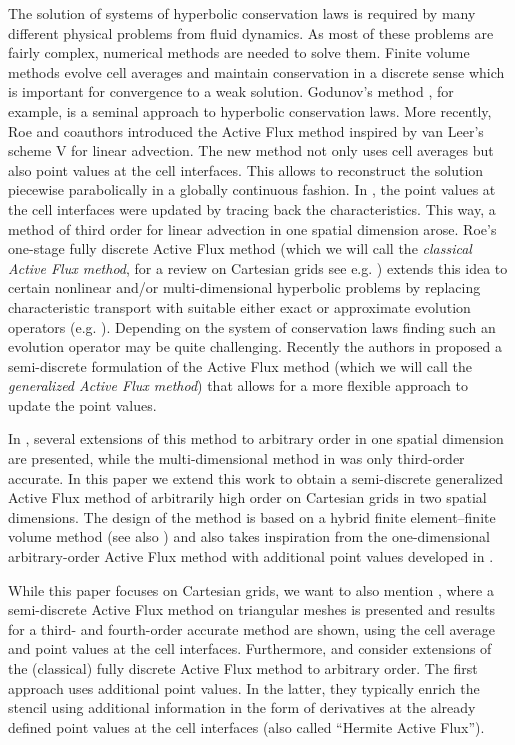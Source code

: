 \documentclass[12pt,a4paper]{article}
\begin{document}
The solution of systems of hyperbolic conservation laws is required by many different physical problems from fluid dynamics. 
As most of these problems are fairly complex, numerical methods are needed to solve them. Finite volume methods evolve cell averages and maintain conservation in a discrete sense which is important for convergence to a weak solution. Godunov's method \cite{God1959}, for example, is a seminal approach to hyperbolic conservation laws. More recently, Roe and coauthors introduced the Active Flux method \cite{ER2011a,ER2011b,ER2013} inspired by van Leer's scheme V \cite{VanLeer1977} for linear advection. The new method not only uses cell averages but also point values at the cell interfaces. This allows to reconstruct the solution piecewise parabolically in a globally continuous fashion. In \cite{VanLeer1977}, the point values at the cell interfaces were updated by tracing back the characteristics. This way, a method of third order for linear advection in one spatial dimension arose. Roe's one-stage fully discrete Active Flux method (which we will call the \emph{classical Active Flux method}, for a review on Cartesian grids see e.g. \cite{CH2023}) extends this idea to certain nonlinear and/or multi-dimensional hyperbolic problems by replacing characteristic transport with suitable either exact or approximate evolution operators (e.g. \cite{maeng17,fan17,BHKR2019,Bar2020,chudzik24}). Depending on the system of conservation laws finding such an evolution operator may be quite challenging. Recently the authors in \cite{Abgrall2023, AB2023ExtensionAF, AB2023FEFV, ABK2025} proposed a semi-discrete formulation of the Active Flux method (which we will call the \emph{generalized Active Flux method}) that allows for a more flexible approach to update the point values. 

In \cite{AB2023ExtensionAF}, several extensions of this method to arbitrary order in one spatial dimension are presented, while the multi-dimensional method in \cite{ABK2025} was only third-order accurate. In this paper we extend this work to obtain a semi-discrete generalized Active Flux method of arbitrarily high order on Cartesian grids in two spatial dimensions. The design of the method is based on a hybrid finite element--finite volume method (see also \cite{AB2023FEFV}) and also takes inspiration from the one-dimensional arbitrary-order Active Flux method with additional point values developed in \cite{AB2023ExtensionAF}.

While this paper focuses on Cartesian grids, we want to also mention \cite{ALL2024}, where a semi-discrete Active Flux method on triangular meshes is presented and results for a third- and fourth-order accurate method are shown, using the cell average and point values at the cell interfaces. 
Furthermore, \cite{He2021} and \cite{Roe2021,RS2023,Samani2024} consider extensions of the (classical) fully discrete Active Flux method to arbitrary order. The first approach uses additional point values. In the latter, they typically enrich the stencil using additional information in the form of derivatives at the already defined point values at the cell interfaces (also called \enquote{Hermite Active Flux}).
\end{document}
